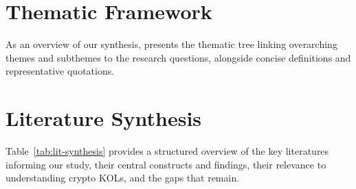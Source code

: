 \appendix \label{app1}
\section{Thematic Framework}

As an overview of our synthesis,  presents the thematic tree linking overarching themes and subthemes to the research questions, alongside concise definitions and representative quotations.




\section{Literature Synthesis}

Table~\ref{tab:lit-synthesis} provides a structured overview of the key literatures informing our study, their central constructs and findings, their relevance to understanding crypto KOLs, and the gaps that remain.

